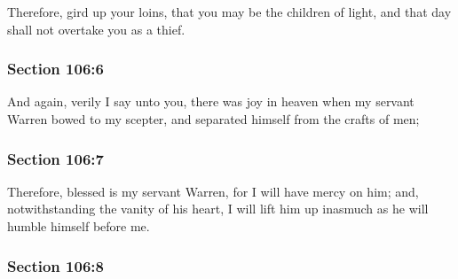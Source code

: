 		Therefore, gird up your loins, that you may be the children of light, and that day shall not overtake you as a thief.


	\subsubsection{Section 106:6} %
		\label{DC106-6}

		And again, verily I say unto you, there was joy in heaven when my servant Warren bowed to my scepter, and separated himself from the crafts of men;


	\subsubsection{Section 106:7} %
		\label{DC106-7}

		Therefore, blessed is my servant Warren, for I will have mercy on him; and, notwithstanding the vanity of his heart, I will lift him up inasmuch as he will humble himself before me.


	\subsubsection{Section 106:8} %
		\label{DC106-8}

